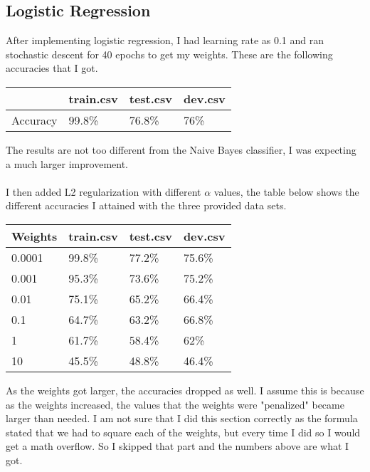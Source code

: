 \documentclass[12pt]{article}
\begin{document}
\subsection{Logistic Regression}
After implementing logistic regression, I had learning rate as 0.1 and ran stochastic descent for 40 epochs to get my weights. These are the following accuracies that I got.
\begin{table}[!h]
\centering
\begin{tabular}{|l|l|l|l|}
\hline
         & train.csv & test.csv & dev.csv \\ \hline
Accuracy & 99.8\%    & 76.8\%   & 76\%  \\ \hline
\end{tabular}
\end{table}
The results are not too different from the Naive Bayes classifier, I was expecting a much larger improvement.\\\\
I then added L2 regularization with different $\alpha$ values, the table below shows the different accuracies I attained with the three provided data sets.
\begin{table}[!h]
\centering
\begin{tabular}{|l|l|l|l|}
\hline
Weights & train.csv & test.csv & dev.csv \\ \hline
0.0001  & 99.8\%    & 77.2\%   & 75.6\%  \\ \hline
0.001   & 95.3\%    & 73.6\%   & 75.2\%  \\ \hline
0.01    & 75.1\%    & 65.2\%   & 66.4\%  \\ \hline
0.1     & 64.7\%    & 63.2\%   & 66.8\%  \\ \hline
1       & 61.7\%    & 58.4\%   & 62\%    \\ \hline
10      & 45.5\%    & 48.8\%   & 46.4\%  \\ \hline
\end{tabular}
\end{table}
As the weights got larger, the accuracies dropped as well. I assume this is because as the weights increased, the values that the weights were "penalized" became larger than needed. I am not sure that I did this section correctly as  the formula stated that we had to square each of the weights, but every time I did so I would get a math overflow. So I skipped that part and the numbers above are what I got.
\end{document}
